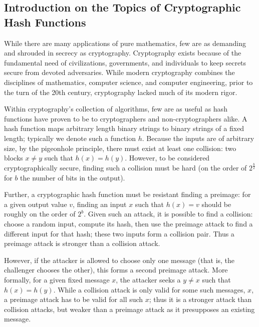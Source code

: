 \documentclass[10pt,twocolumn,twoside]{pnas-new}
\begin{document}
%

\subsection{Introduction on the Topics of Cryptographic Hash Functions} \label{sec:i:hash}

    While there are many applications of pure mathematics, few are as
demanding and shrouded in secrecy as cryptography. Cryptography exists
because of the fundamental need of civilizations, governments, and individuals
to keep secrets secure from devoted adversaries. While modern cryptography
combines the disciplines of mathematics, computer science, and computer
engineering, prior to the turn of the 20th century, cryptography lacked much
of its modern rigor.

    Within cryptography's collection of algorithms, few are as useful as
hash functions have proven to be to cryptographers and non-cryptographers
alike. A hash function maps arbitrary length binary strings to binary strings
of a fixed length; typically we denote such a function $h$. Because the inputs
are of arbitrary size, by the pigeonhole principle, there must exist at least
one collision: two blocks $x \neq y$ such that $h(x) = h(y)$. However, to be
considered cryptographically secure, finding such a collision must be hard
(on the order of $2^{\frac{b}{2}}$ for $b$ the number of bits in the output).

    Further, a cryptographic hash function must be resistant finding a
preimage: for a given output value $v$, finding an input $x$ such that
$h(x) = v$ should be roughly on the order of $2^{b}$. Given such an attack,
it is possible to find a collision: choose a random input, compute its hash,
then use the preimage attack to find a different input for that hash; these two
inputs form a collision pair. Thus a preimage attack is stronger than a
collision attack.

    However, if the attacker is allowed to choose only one message (that is,
the challenger chooses the other), this forms a second preimage attack. More
formally, for a given fixed message $x$, the attacker seeks a $y \neq x$ such
that $h(x) = h(y)$. While a collision attack is only valid for some such
messages, $x$, a preimage attack has to be valid for all such $x$; thus it is
a stronger attack than collision attacks, but weaker than a preimage attack
as it presupposes an existing message.
\end{document}
